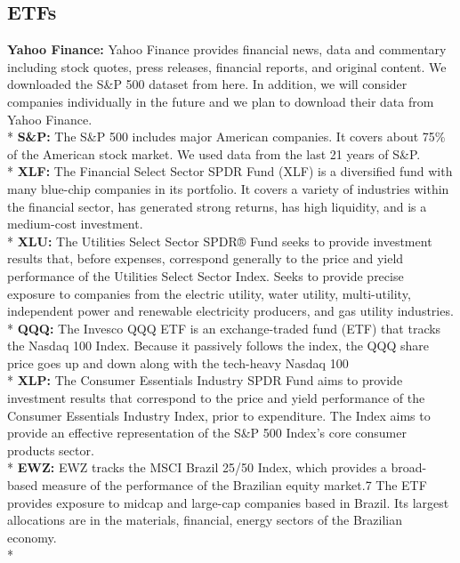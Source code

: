 \documentclass[]{article}
\begin{document}
\subsection{ETFs}
\textbf{Yahoo Finance:} Yahoo Finance provides financial news, data and commentary including stock quotes, press releases, financial reports, and original content. We downloaded the S\&P 500 dataset from here. In addition, we will consider companies individually in the future and we plan to download their data from Yahoo Finance.\vspace{0.1cm}\\*
\textbf{S\&P:} The S\&P 500 includes major American companies. It covers about 75\% of the American stock market. We used data from the last 21 years of S\&P.\vspace{0.1cm}\\*
\textbf{XLF:} The Financial Select Sector SPDR Fund (XLF) is a diversified fund with many blue-chip companies in its portfolio. It covers a variety of industries within the financial sector, has generated strong returns, has high liquidity, and is a medium-cost investment. \vspace{0.1cm}\\*
\textbf{XLU:} The Utilities Select Sector SPDR® Fund seeks to provide investment results that, before expenses, correspond generally to the price and yield performance of the Utilities Select Sector Index. \newline Seeks to provide precise exposure to companies from the electric utility, water utility, multi-utility, independent power and renewable electricity producers, and gas utility industries. \vspace{0.1cm}\\*
\textbf{QQQ:} The Invesco QQQ ETF is an exchange-traded fund (ETF) that tracks the Nasdaq 100 Index. Because it passively follows the index, the QQQ share price goes up and down along with the tech-heavy Nasdaq 100 \vspace{0.1cm}\\*
\textbf{XLP:} The Consumer Essentials Industry SPDR\® Fund aims to provide investment results that correspond to the price and yield performance of the Consumer Essentials Industry Index, prior to expenditure. The Index aims to provide an effective representation of the S&P 500 Index's core consumer products sector.\vspace{0.1cm}\\*
\textbf{EWZ:} EWZ tracks the MSCI Brazil 25/50 Index, which provides a broad-based measure of the performance of the Brazilian equity market.7 The ETF provides exposure to midcap and large-cap companies based in Brazil. Its largest allocations are in the materials, financial, energy sectors of the Brazilian economy. \vspace{0.1cm}\\*
\end{document}
